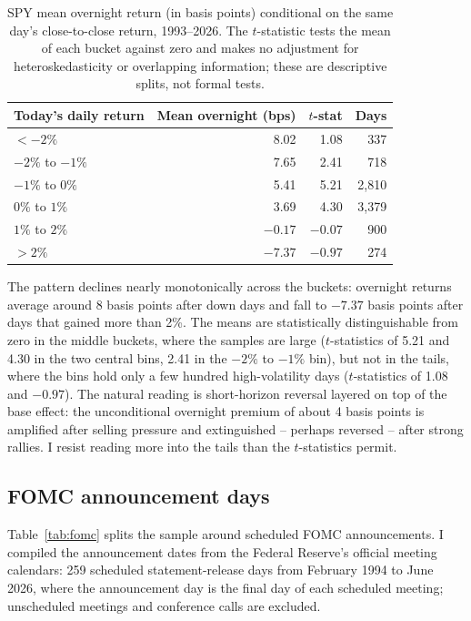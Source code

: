 \documentclass[11pt]{article}
\begin{document}
\begin{table}[t]
\centering
\caption{SPY mean overnight return (in basis points) conditional on the same day's close-to-close return, 1993--2026. The $t$-statistic tests the mean of each bucket against zero and makes no adjustment for heteroskedasticity or overlapping information; these are descriptive splits, not formal tests.}
\label{tab:prevday}
\begin{tabular}{lrrr}
\toprule
Today's daily return & Mean overnight (bps) & $t$-stat & Days \\
\midrule
$<-2\%$ & 8.02 & 1.08 & 337 \\
$-2\%$ to $-1\%$ & 7.65 & 2.41 & 718 \\
$-1\%$ to $0\%$ & 5.41 & 5.21 & 2,810 \\
$0\%$ to $1\%$ & 3.69 & 4.30 & 3,379 \\
$1\%$ to $2\%$ & $-0.17$ & $-0.07$ & 900 \\
$>2\%$ & $-7.37$ & $-0.97$ & 274 \\
\bottomrule
\end{tabular}
\end{table}

The pattern declines nearly monotonically across the buckets: overnight returns average around 8 basis points after down days and fall to $-7.37$ basis points after days that gained more than 2\%. The means are statistically distinguishable from zero in the middle buckets, where the samples are large ($t$-statistics of 5.21 and 4.30 in the two central bins, 2.41 in the $-2\%$ to $-1\%$ bin), but not in the tails, where the bins hold only a few hundred high-volatility days ($t$-statistics of 1.08 and $-0.97$). The natural reading is short-horizon reversal layered on top of the base effect: the unconditional overnight premium of about 4 basis points is amplified after selling pressure and extinguished -- perhaps reversed -- after strong rallies. I resist reading more into the tails than the $t$-statistics permit.

\subsection{FOMC announcement days}

Table~\ref{tab:fomc} splits the sample around scheduled FOMC announcements. I compiled the announcement dates from the Federal Reserve's official meeting calendars: 259 scheduled statement-release days from February 1994 to June 2026, where the announcement day is the final day of each scheduled meeting; unscheduled meetings and conference calls are excluded.
\end{document}
